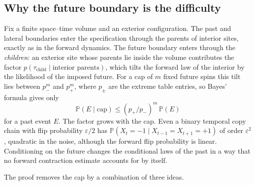 \documentclass[11pt]{article}
\theoremstyle{plain}
\theoremstyle{definition}
\theoremstyle{remark}
\newcommand{\Prob}{\mathbb{P}}
\newcommand{\eps}{\varepsilon}
\begin{document}
\subsection{Why the future boundary is the difficulty}
\label{sec:why}

Fix a finite space--time volume and an exterior configuration. The past and lateral boundaries enter the specification through the parents of interior sites, exactly as in the forward dynamics. The future boundary enters through the \emph{children}: an exterior site whose parents lie inside the volume contributes the factor $p(\tau_{\text{child}}\mid\text{interior parents})$, which tilts the forward law of the interior by the likelihood of the imposed future. For a cap of $m$ fixed future spins this tilt lies between $p_-^m$ and $p_+^m$, where $p_\pm$ are the extreme table entries, so Bayes' formula gives only
\[
\Prob(E\mid\text{cap})\le (p_+/p_-)^m\,\Prob(E)
\]
for a past event $E$. The factor grows with the cap. Even a binary temporal copy chain with flip probability $\eps/2$ has $\Prob(X_t=-1\mid X_{t-1}=X_{t+1}=+1)$ of order $\eps^2$, quadratic in the noise, although the forward flip probability is linear. Conditioning on the future changes the conditional laws of the past in a way that no forward contraction estimate accounts for by itself.

The proof removes the cap by a combination of three ideas.
\end{document}

